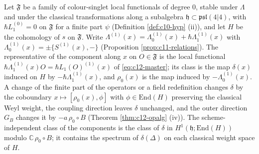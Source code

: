 \begin{definition}
\label{def:c12-class}
Let $\mathfrak F$ be a family of colour-singlet local functionals of degree $0$, stable under $\Lambda$ and under the classical transformations along a subalgebra $\mathfrak h\subset\mathfrak{psl}(4|4)$, with $\hbar L_1^{(0)}=0$ on $\mathfrak F$ for a finite part $\psi$ (Definition \ref{def:c10-hyp} (ii)), and let $H$ be the cohomology of $s$ on $\mathfrak F$. Write $\Lambda^{(1)}(x)=\Lambda^{(1)}_0(x)+\hbar\Lambda^{(1)}_1(x)$ with $\Lambda^{(1)}_0(x)=\pm\{S^{(1)}(x),-\}$ (Proposition \ref{prop:c11-relations}). The representative of the component along $x$ on $O\in\mathfrak F$ is the local functional $\hbar\Lambda^{(1)}_1(x)O=\hbar L_1(O)^{(1)}(x)$ of \eqref{eq:c12-master}; its class is the map $\delta(x)$ induced on $H$ by $-\hbar\Lambda^{(1)}_1(x)$, and $\rho_0(x)$ is the map induced by $-\Lambda^{(1)}_0(x)$. A change of the finite part of the operators or a field redefinition changes $\delta$ by the coboundary $x\mapsto[\rho_0(x),\phi]$ with $\phi\in\mathrm{End}(H)$ preserving the classical Weyl weight, the coupling direction leaves $\delta$ unchanged, and the outer direction $G_B$ changes it by $-a\,\rho_0\circ B$ (Theorem \ref{thm:c12-opalg} (iv)). The scheme-independent class of the components is the class of $\delta$ in $H^1(\mathfrak h;\mathrm{End}(H))$ modulo $\mathbb C\,\rho_0\circ B$; it contains the spectrum of $\delta(\Delta)$ on each classical weight space of $H$.
\end{definition}

